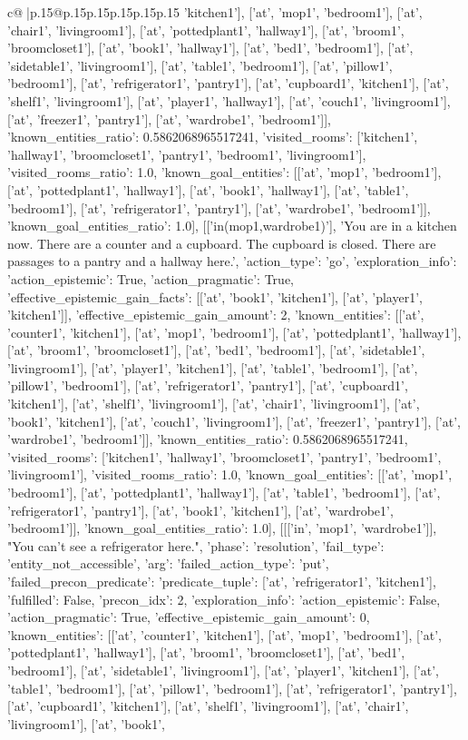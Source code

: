 \documentclass{article}
\begin{document}
{\begin{supertabular}{c@{$\;$}|p{.15\linewidth}@{}p{.15\linewidth}p{.15\linewidth}p{.15\linewidth}p{.15\linewidth}p{.15\linewidth}}
{{{'kitchen1'], ['at', 'mop1', 'bedroom1'], ['at', 'chair1', 'livingroom1'], ['at', 'pottedplant1', 'hallway1'], ['at', 'broom1', 'broomcloset1'], ['at', 'book1', 'hallway1'], ['at', 'bed1', 'bedroom1'], ['at', 'sidetable1', 'livingroom1'], ['at', 'table1', 'bedroom1'], ['at', 'pillow1', 'bedroom1'], ['at', 'refrigerator1', 'pantry1'], ['at', 'cupboard1', 'kitchen1'], ['at', 'shelf1', 'livingroom1'], ['at', 'player1', 'hallway1'], ['at', 'couch1', 'livingroom1'], ['at', 'freezer1', 'pantry1'], ['at', 'wardrobe1', 'bedroom1']], 'known_entities_ratio': 0.5862068965517241, 'visited_rooms': ['kitchen1', 'hallway1', 'broomcloset1', 'pantry1', 'bedroom1', 'livingroom1'], 'visited_rooms_ratio': 1.0, 'known_goal_entities': [['at', 'mop1', 'bedroom1'], ['at', 'pottedplant1', 'hallway1'], ['at', 'book1', 'hallway1'], ['at', 'table1', 'bedroom1'], ['at', 'refrigerator1', 'pantry1'], ['at', 'wardrobe1', 'bedroom1']], 'known_goal_entities_ratio': 1.0}}], [['in(mop1,wardrobe1)'], 'You are in a kitchen now. There are a counter and a cupboard. The cupboard is closed. There are passages to a pantry and a hallway here.', {'action_type': 'go', 'exploration_info': {'action_epistemic': True, 'action_pragmatic': True, 'effective_epistemic_gain_facts': [['at', 'book1', 'kitchen1'], ['at', 'player1', 'kitchen1']], 'effective_epistemic_gain_amount': 2, 'known_entities': [['at', 'counter1', 'kitchen1'], ['at', 'mop1', 'bedroom1'], ['at', 'pottedplant1', 'hallway1'], ['at', 'broom1', 'broomcloset1'], ['at', 'bed1', 'bedroom1'], ['at', 'sidetable1', 'livingroom1'], ['at', 'player1', 'kitchen1'], ['at', 'table1', 'bedroom1'], ['at', 'pillow1', 'bedroom1'], ['at', 'refrigerator1', 'pantry1'], ['at', 'cupboard1', 'kitchen1'], ['at', 'shelf1', 'livingroom1'], ['at', 'chair1', 'livingroom1'], ['at', 'book1', 'kitchen1'], ['at', 'couch1', 'livingroom1'], ['at', 'freezer1', 'pantry1'], ['at', 'wardrobe1', 'bedroom1']], 'known_entities_ratio': 0.5862068965517241, 'visited_rooms': ['kitchen1', 'hallway1', 'broomcloset1', 'pantry1', 'bedroom1', 'livingroom1'], 'visited_rooms_ratio': 1.0, 'known_goal_entities': [['at', 'mop1', 'bedroom1'], ['at', 'pottedplant1', 'hallway1'], ['at', 'table1', 'bedroom1'], ['at', 'refrigerator1', 'pantry1'], ['at', 'book1', 'kitchen1'], ['at', 'wardrobe1', 'bedroom1']], 'known_goal_entities_ratio': 1.0}}], [[['in', 'mop1', 'wardrobe1']], "You can't see a refrigerator here.", {'phase': 'resolution', 'fail_type': 'entity_not_accessible', 'arg': {'failed_action_type': 'put', 'failed_precon_predicate': {'predicate_tuple': ['at', 'refrigerator1', 'kitchen1'], 'fulfilled': False, 'precon_idx': 2}}, 'exploration_info': {'action_epistemic': False, 'action_pragmatic': True, 'effective_epistemic_gain_amount': 0, 'known_entities': [['at', 'counter1', 'kitchen1'], ['at', 'mop1', 'bedroom1'], ['at', 'pottedplant1', 'hallway1'], ['at', 'broom1', 'broomcloset1'], ['at', 'bed1', 'bedroom1'], ['at', 'sidetable1', 'livingroom1'], ['at', 'player1', 'kitchen1'], ['at', 'table1', 'bedroom1'], ['at', 'pillow1', 'bedroom1'], ['at', 'refrigerator1', 'pantry1'], ['at', 'cupboard1', 'kitchen1'], ['at', 'shelf1', 'livingroom1'], ['at', 'chair1', 'livingroom1'], ['at', 'book1', }}}
\end{supertabular}}
\end{document}
